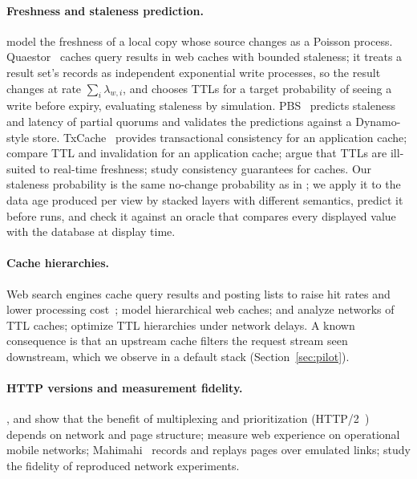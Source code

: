 \documentclass[acmsmall,review,nonacm]{acmart}
\begin{document}
\paragraph{Freshness and staleness prediction.}
\citet{cho2000freshness} model the freshness of a local copy whose source changes as a Poisson process. Quaestor~\cite{gessert2017quaestor} caches query results in web caches with bounded staleness; it treats a result set's records as independent exponential write processes, so the result changes at rate $\sum_i \lambda_{w,i}$, and chooses TTLs for a target probability of seeing a write before expiry, evaluating staleness by simulation. PBS~\cite{bailis2012pbs} predicts staleness and latency of partial quorums and validates the predictions against a Dynamo-style store. TxCache~\cite{ports2010txcache} provides transactional consistency for an application cache; \citet{ji2023transparent} compare TTL and invalidation for an application cache; \citet{mao2024freshness} argue that TTLs are ill-suited to real-time freshness; \citet{an2026monotonicity} study consistency guarantees for caches. Our staleness probability is the same no-change probability as in \cite{cho2000freshness,gessert2017quaestor}; we apply it to the data age produced per view by stacked layers with different semantics, predict it before runs, and check it against an oracle that compares every displayed value with the database at display time.

\paragraph{Cache hierarchies.}
Web search engines cache query results and posting lists to raise hit rates and lower processing cost~\cite{baezayates2008searchcache,ozcan2011costaware}; \citet{che2002hierarchical} model hierarchical web caches; \citet{fofack2014ttl} and \citet{berger2014exact} analyze networks of TTL caches; \citet{elsayed2024ttl} optimize TTL hierarchies under network delays. A known consequence is that an upstream cache filters the request stream seen downstream, which we observe in a default stack (Section~\ref{sec:pilot}).

\paragraph{HTTP versions and measurement fidelity.}
\citet{wang2014spdy}, \citet{varvello2016h2} and \citet{wijnants2018h2prio} show that the benefit of multiplexing and prioritization (HTTP/2~\cite{rfc9113}) depends on network and page structure; \citet{rajiullah2019mobile} measure web experience on operational mobile networks; Mahimahi~\cite{netravali2015mahimahi} records and replays pages over emulated links; \citet{pediaditakis2014faithful} study the fidelity of reproduced network experiments.
\end{document}
